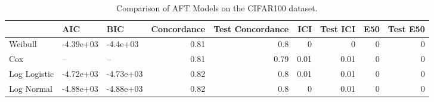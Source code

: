 \begin{table*}
\centering
\caption{Comparison of AFT Models on the CIFAR100 dataset.}
\label{tab:cifar100}
\begin{tabular}{lllrrrrrr}
\toprule
 & AIC & BIC & Concordance & Test Concordance & ICI & Test ICI & E50 & Test E50 \\
\midrule
Weibull & -4.39e+03 & -4.4e+03 & 0.81 & 0.8 & 0 & 0 & 0 & 0 \\
Cox & -- & -- & 0.81 & 0.79 & 0.01 & 0.01 & 0 & 0 \\
Log Logistic & -4.72e+03 & -4.73e+03 & 0.82 & 0.8 & 0.01 & 0.01 & 0 & 0 \\
Log Normal & -4.88e+03 & -4.88e+03 & 0.82 & 0.8 & 0 & 0.01 & 0 & 0 \\
\bottomrule
\end{tabular}
\end{table*}
